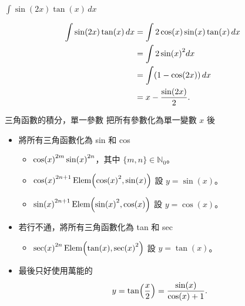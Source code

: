 \documentclass{beamer}
\newcommand{\Left} {\mathopen{}\mathclose\bgroup\left}
\newcommand{\Right}{\aftergroup\egroup\right}
\newcommand{\N}{\mathbb N}
\newcommand{\Elem}{\operatorname{Elem}}
\theoremstyle{remark}
\begin{document}
\begin{CJK}{UTF8}{bsmi}
\begin{frame}{$\displaystyle \int \sin(2x) \tan(x)\,dx$}
  \begin{solution}
    \begin{align*}
      \int \sin(2x) \tan(x)\,dx &= \int 2 \cos(x) \sin(x) \tan(x)\,dx\\
	&= \int 2 \sin \Left( x \Right)^2 dx\\
	&= \int (1 - \cos(2x))\,dx\\
	&= x - \frac{\sin(2x)}{2}.
    \end{align*}
  \end{solution}
\end{frame}

\begin{frame}{三角函數的積分，單一參數}
  把所有參數化為單一變數 $x$ 後
  \begin{itemize}
    \item 將所有三角函數化為 sin 和 cos
      \begin{itemize}
	\item $\cos \Left( x \Right)^{2m} \sin \Left( x \Right)^{2n}$，其中 $\{m,n\} \in \N_0$。
	\item $\cos \Left( x \Right)^{2n+1} \Elem \Left( \cos \Left( x \Right)^2, \sin(x) \Right)$ 設 $y = \sin(x)$。
	\item $\sin \Left( x \Right)^{2n+1} \Elem \Left( \sin \Left( x \Right)^2, \cos(x) \Right)$ 設 $y = \cos(x)$。
      \end{itemize}
    \item 若行不通，將所有三角函數化為 tan 和 sec
      \begin{itemize}
	\item $\sec \Left( x \Right)^{2n} \Elem \Left( \tan(x), \sec \Left( x \Right)^2 \Right)$ 設 $y = \tan(x)$。
      \end{itemize}
    \item 最後只好使用萬能的
      \[y = \tan \Left( \frac x 2 \Right) = \frac{\sin(x)}{\cos(x) + 1}.\]
  \end{itemize}
\end{frame}


\end{CJK}
\end{document}
